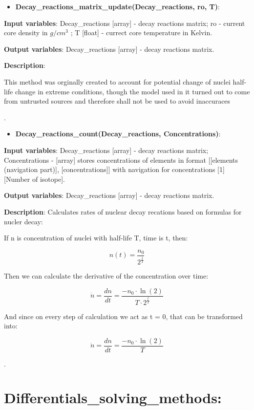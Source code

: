 \documentclass[a4paper,12pt]{article}
\newcommand{\namefunction}[4]{
  \begin{itemize}
    \item \textbf{#1}:
  \end{itemize}
  
  \textbf{Input variables}: #2.
  
  \textbf{Output variables}: #4.
  
  \textbf{Description}: #3.
}
\begin{document}
\vspace{1em}

\namefunction{Decay\_reactions\_matrix\_update(Decay\_reactions, ro, T)}{Decay\_reactions [array] - decay reactions matrix; ro - current core density in $g/cm^3$ ; T [float] - currect core temperature in Kelvin}{

This method was orginally created to account for potential change of nuclei half-life change in extreme conditions, though the model used in it turned out to come from untrusted sources and therefore shall not be used to avoid inaccuraces

}{Decay\_reactions [array] - decay reactions matrix}

\vspace{1em}

\namefunction{Decay\_reactions\_count(Decay\_reactions, Concentrations)}{Decay\_reactions [array] - decay reactions matrix; Concentrations - [array] stores concentrations of elements in format [[elements (navigation part)], [concentrations]] with navigation for concentrations [1][Number of isotope]}{Calculates rates of nuclear decay recations based on formulas for nucler decay:

If n is concentration of nuclei with half-life T, time is t, then:

\[
n(t) = \frac{n_0}{2^{\frac{t}{T}}}
\]

Then we can calculate the derivative of the concentration over time:

\[
\dot{n} = \frac{dn}{dt} = \frac{-n_0 \cdot \ln(2)}{T \cdot 2^{\frac{t}{T}}}
\]

And since on every step of calculation we act as t = 0, that can be transformed into:

\[\dot{n} = \frac{dn}{dt} = \frac{-n_0 \cdot \ln(2)}{T}\]

}{Decay\_reactions [array] - decay reactions matrix}

\section{Differentials\_solving\_methods:}

\vspace{1em}
\end{document}
